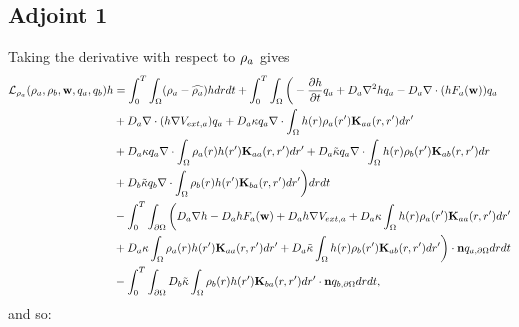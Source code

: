 	\subsection{Adjoint 1}
	Taking the derivative with respect to $\rho_a$ gives
	\begin{align*}
		\mathcal{L}_{\rho_a}(\rho_a,\rho_b, \mathbf{w}, q_a, q_b) h &= \int_0^T \int_\Omega ( \rho_a - \widehat{\rho_a})h dr dt 
       + \int_0^T \int_\Omega \bigg(-\frac{\partial h}{\partial t}q_a + D_a\nabla^2 h q_a - D_a\nabla \cdot(h F_a(\mathbf{w})) q_a\\
		&  + D_a \nabla \cdot (h \nabla V_{ext,a}) q_a + D_a\kappa q_a \nabla \cdot \int_\Omega  h(r) \rho_a (r') \mathbf{K}_{aa}(r,r')dr' \\
		&+ D_a\kappa q_a \nabla \cdot \int_\Omega  \rho_a (r) h (r') \mathbf{K}_{aa}(r,r')dr' + D_a \tilde{\kappa}q_a \nabla \cdot \int_\Omega  h(r) \rho_b (r') \mathbf{K}_{ab} (r,r')dr  \\
		& + D_b\tilde{\kappa}q_b \nabla \cdot \int_\Omega \rho_b(r) h (r')\mathbf{K}_{ba}(r,r')dr'\bigg)  dr dt\\
		&- \int_0^T \int_{\partial \Omega} \bigg( D_a \nabla h - D_a h F_a(\mathbf{w}) + D_a h \nabla V_{ext,a} + D_a\kappa \int_\Omega h(r) \rho_a (r') \mathbf{K}_{aa}(r,r')dr' \\
		&+ D_a\kappa \int_\Omega \rho_a(r) h(r') \mathbf{K}_{aa}(r,r')dr'+  D_a\tilde{\kappa} \int_\Omega h(r) \rho_b (r') \mathbf{K}_{ab}(r,r')dr' \bigg) \cdot \mathbf{n} q_{a,\partial \Omega} dr dt\\
		&- \int_0^T \int_{\partial \Omega}  D_b\tilde{\kappa} \int_\Omega \rho_b(r) h(r') \mathbf{K}_{ba}(r,r')dr'  \cdot \mathbf{n} q_{b,\partial \Omega} dr dt,
	\end{align*}
	and so:
